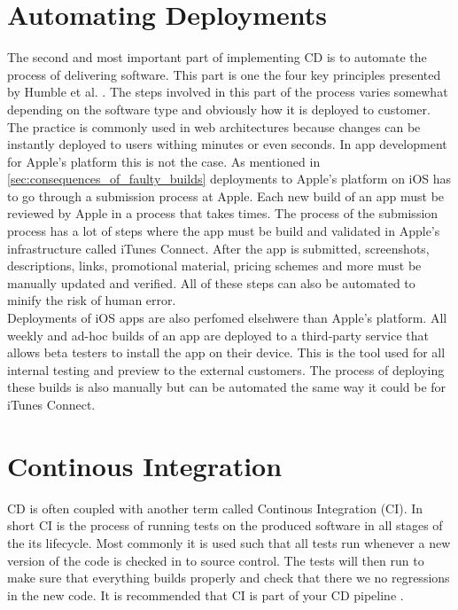 \documentclass{ituthesis}
\begin{document}
\section{Automating Deployments}

The second and most important part of implementing CD is to automate the process of delivering software. This part is one the four key principles presented by Humble et al. \cite{Humble2006}. The steps involved in this part of the process varies somewhat depending on the software type and obviously how it is deployed to customer.\\

The practice is commonly used in web architectures because changes can be instantly deployed to users withing minutes or even seconds. In app development for Apple's platform this is not the case. As mentioned in \autoref{sec:consequences_of_faulty_builds} deployments to Apple's platform on iOS has to go through a submission process at Apple. Each new build of an app must be reviewed by Apple in a process that takes times. The process of the submission process has a lot of steps where the app must be build and validated in Apple's infrastructure called iTunes Connect. After the app is submitted, screenshots, descriptions, links, promotional material, pricing schemes and more must be manually updated and verified. All of these steps can also be automated to minify the risk of human error.\\

Deployments of iOS apps are also perfomed elsehwere than Apple's platform. All weekly and ad-hoc builds of an app are deployed to a third-party service that allows beta testers to install the app on their device. This is the tool used for all internal testing and preview to the external customers. The process of deploying these builds is also manually but can be automated the same way it could be for iTunes Connect.

\section{Continous Integration}

CD is often coupled with another term called Continous Integration (CI). In short CI is the process of running tests on the produced software in all stages of the its lifecycle. Most commonly it is used such that all tests run whenever a new version of the code is checked in to source control. The tests will then run to make sure that everything builds properly and check that there we no regressions in the new code. It is recommended that CI is part of your CD pipeline \cite{Humble2010} \cite{Chen2015}.\\
\end{document}
